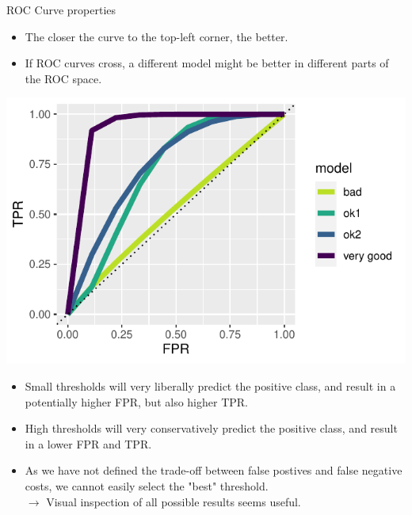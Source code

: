 \begin{vbframe}{ROC Curve properties}

\begin{minipage}[c]{0.5\textwidth}
  \begin{itemize}
    \item The closer the curve to the top-left corner, the better.
    \item If ROC curves cross, a different model might be better in different 
    parts of the ROC space.
\end{itemize}
\end{minipage}%
\begin{minipage}[c]{0.5\textwidth}
  \centering 
  \includegraphics[width=\textwidth]{figure/eval_mclass_roc_sp_12}
\end{minipage}

\lz

\begin{itemize}
  \item Small thresholds will very liberally predict the positive class, and 
  result in a potentially higher FPR, but also higher TPR.
  \item High thresholds will very conservatively predict the positive class, 
  and result in a lower FPR and TPR.
  \item As we have not defined the trade-off between false postives and false 
  negative costs, we cannot easily select the "best" threshold. \\
  $\rightarrow$ Visual inspection of all possible results seems useful.
\end{itemize}

% 


\end{vbframe}
